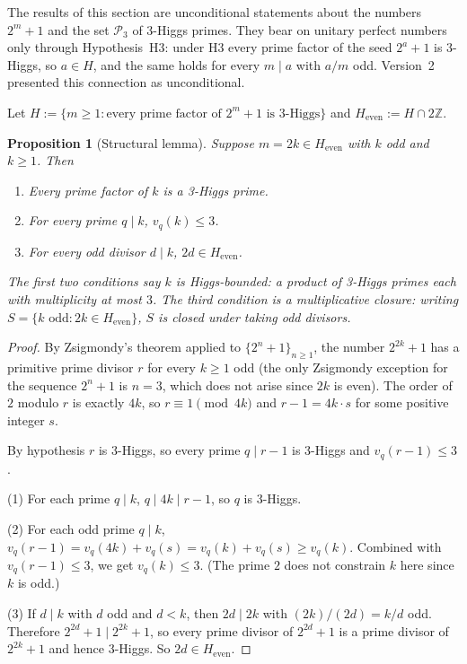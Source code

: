 \documentclass[11pt]{amsart}
\theoremstyle{plain}
\newtheorem{proposition}[theorem]{Proposition}
\theoremstyle{definition}
\begin{document}
The results of this section are unconditional statements about the numbers
$2^m+1$ and the set $\mathcal P_3$ of 3-Higgs primes.  They bear on unitary
perfect numbers only through Hypothesis~H3: under H3 every prime factor of the
seed $2^a+1$ is 3-Higgs, so $a\in H$, and the same holds for every $m\mid a$
with $a/m$ odd.  Version~2 presented this connection as unconditional.

Let $H := \{ m \ge 1 : \text{every prime factor of } 2^m + 1
\text{ is 3-Higgs} \}$ and $H_{\mathrm{even}} := H \cap 2\mathbb{Z}$.

\begin{proposition}[Structural lemma]\label{prop:Heven-structure}
Suppose $m = 2k \in H_{\mathrm{even}}$ with $k$ odd and $k \ge 1$. Then
\begin{enumerate}[label=(\arabic*),leftmargin=*]
\item Every prime factor of $k$ is a 3-Higgs prime.
\item For every prime $q \mid k$, $v_q(k) \le 3$.
\item For every odd divisor $d \mid k$, $2d \in H_{\mathrm{even}}$.
\end{enumerate}
The first two conditions say $k$ is \emph{Higgs-bounded}: a product
of 3-Higgs primes each with multiplicity at most $3$. The third
condition is a multiplicative closure: writing
$S = \{k \text{ odd} : 2k \in H_{\mathrm{even}}\}$, $S$ is closed
under taking odd divisors.
\end{proposition}

\begin{proof}
By Zsigmondy's theorem applied to $\{2^n+1\}_{n \ge 1}$, the number
$2^{2k}+1$ has a primitive prime divisor $r$ for every $k \ge 1$ odd
(the only Zsigmondy exception for the sequence $2^n+1$ is $n = 3$,
which does not arise since $2k$ is even). The order of $2$ modulo $r$
is exactly $4k$, so $r \equiv 1 \pmod{4k}$ and $r - 1 = 4k \cdot s$
for some positive integer $s$.

By hypothesis $r$ is 3-Higgs, so every prime $q \mid r - 1$ is
3-Higgs and $v_q(r-1) \le 3$.

\noindent (1) For each prime $q \mid k$, $q \mid 4k \mid r - 1$, so $q$ is
3-Higgs.

\noindent (2) For each odd prime $q \mid k$,
$v_q(r-1) = v_q(4k) + v_q(s) = v_q(k) + v_q(s) \ge v_q(k)$. Combined
with $v_q(r-1) \le 3$, we get $v_q(k) \le 3$. (The prime $2$ does not
constrain $k$ here since $k$ is odd.)

\noindent (3) If $d \mid k$ with $d$ odd and $d < k$, then
$2d \mid 2k$ with $(2k)/(2d) = k/d$ odd. Therefore
$2^{2d}+1 \mid 2^{2k}+1$, so every prime divisor of $2^{2d}+1$ is a
prime divisor of $2^{2k}+1$ and hence 3-Higgs. So $2d \in H_{\mathrm{even}}$.
\end{proof}
\end{document}
